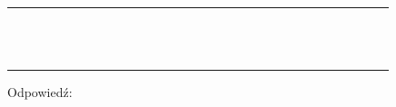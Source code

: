 \documentclass[10pt]{article}
\begin{document}
\begin{center}
\begin{tabular}{|c|c|c|c|c|c|c|c|c|c|c|c|c|c|c|c|c|c|c|c|c|c|c|c|c|c|c|c|c|c|}
\hline
 &  &  &  &  &  &  &  &  &  &  &  &  &  &  &  &  &  &  &  &  &  &  &  &  &  &  &  &  &  \\
\hline
 &  &  &  &  &  &  &  &  &  &  &  &  &  &  &  &  &  &  &  &  &  &  &  &  &  &  &  &  &  \\
\hline
 &  &  &  &  &  &  &  &  &  &  &  &  &  &  &  &  &  &  &  &  &  &  &  &  &  &  &  &  &  \\
\hline
 &  &  &  &  &  &  &  &  &  &  &  &  &  &  &  &  &  &  &  &  &  &  &  &  &  &  &  &  &  \\
\hline
 &  &  &  &  &  &  &  &  &  &  &  &  &  &  &  &  &  &  &  &  &  &  &  &  &  &  &  &  &  \\
\hline
 &  &  &  &  &  &  &  &  &  &  &  &  &  &  &  &  &  &  &  &  &  &  &  &  &  &  &  &  &  \\
\hline
 &  &  &  &  &  &  &  &  &  &  &  &  &  &  &  &  &  &  &  &  &  &  &  &  &  &  &  &  &  \\
\hline
 &  &  &  &  &  &  &  &  &  &  &  &  &  &  &  &  &  &  &  &  &  &  &  &  &  &  &  &  &  \\
\hline
 &  &  &  &  &  &  &  &  &  &  &  &  &  &  &  &  &  &  &  &  &  &  &  &  &  &  &  &  &  \\
\hline
 &  &  &  &  &  &  &  &  &  &  &  &  &  &  &  &  &  &  &  &  &  &  &  &  &  &  &  &  &  \\
\hline
 &  &  &  &  &  &  &  &  &  &  &  &  &  &  &  &  &  &  &  &  &  &  &  &  &  &  &  &  &  \\
\hline
 &  &  &  &  &  &  &  &  &  &  &  &  &  &  &  &  &  &  &  &  &  &  &  &  &  &  &  &  &  \\
\hline
 &  &  &  &  &  &  &  &  &  &  &  &  &  &  &  &  &  &  &  &  &  &  &  &  &  &  &  &  &  \\
\hline
 &  &  &  &  &  &  &  &  &  &  &  &  &  &  &  &  &  &  &  &  &  &  &  &  &  &  &  &  &  \\
\hline
\end{tabular}
\end{center}

Odpowiedź:
\end{document}
